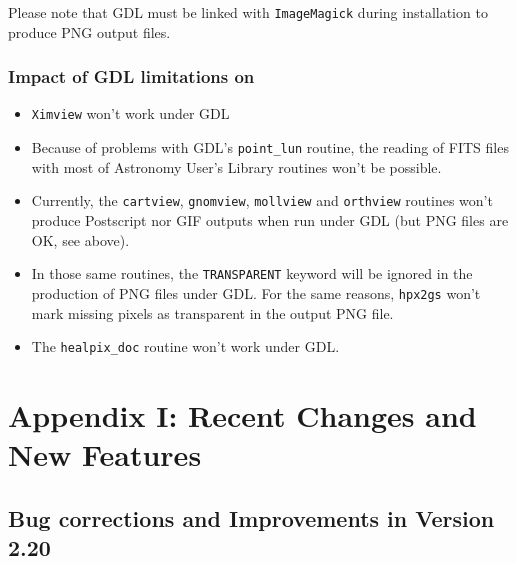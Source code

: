 \documentclass[12pt,twoside]{article}
\begin{document}
Please note that GDL must be linked with {\tt ImageMagick} during installation to produce PNG
output files.

\subsubsection{Impact of GDL limitations on \healpix}
\begin{itemize}
\item {\tt Ximview} won't work under GDL \gdlversion
\item Because of problems with GDL's {\tt point\_lun} routine, the reading of
FITS files with most of Astronomy User's Library routines won't be possible.
\item Currently, the 
{\tt cartview},
{\tt gnomview},
{\tt mollview} and  
{\tt orthview} 
routines won't produce Postscript nor GIF outputs when run under GDL (but PNG
files are OK, see above).
\item In those same routines, the {\tt TRANSPARENT} keyword will be ignored in the
production of PNG files under GDL. For the same reasons, {\tt hpx2gs} won't mark missing pixels as
transparent in the output PNG file.
\item The {\tt healpix\_doc} routine won't work under GDL.
\end{itemize}


\vfill\newpage
\section{Appendix I: Recent Changes and New Features}
\label{sec:newfeatures}
\subsection{Bug corrections and Improvements in Version 2.20} %
\end{document}

